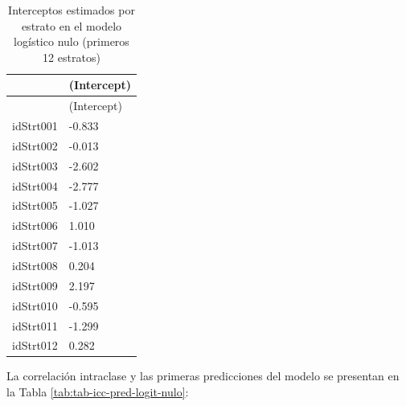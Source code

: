 \documentclass[
  spanish,
  12pt,
]{book}
\newenvironment{Shaded}{\begin{snugshade}}{\end{snugshade}}
\newcommand{\AttributeTok}[1]{\textcolor[rgb]{0.13,0.29,0.53}{#1}}
\newcommand{\DataTypeTok}[1]{\textcolor[rgb]{0.13,0.29,0.53}{#1}}
\newcommand{\DecValTok}[1]{\textcolor[rgb]{0.00,0.00,0.81}{#1}}
\newcommand{\FunctionTok}[1]{\textcolor[rgb]{0.13,0.29,0.53}{\textbf{#1}}}
\newcommand{\NormalTok}[1]{#1}
\newcommand{\OtherTok}[1]{\textcolor[rgb]{0.56,0.35,0.01}{#1}}
\newcommand{\SpecialCharTok}[1]{\textcolor[rgb]{0.81,0.36,0.00}{\textbf{#1}}}
\newcommand{\StringTok}[1]{\textcolor[rgb]{0.31,0.60,0.02}{#1}}
\begin{document}
\begin{longtable}[]{@{}ll@{}}
\caption{\label{tab:tab-coef-logit-nulo}Interceptos estimados por estrato en el modelo logístico nulo (primeros 12 estratos)}\tabularnewline
\toprule\noalign{}
& (Intercept) \\
\midrule\noalign{}
\endfirsthead
\toprule\noalign{}
& (Intercept) \\
\midrule\noalign{}
\endhead
\bottomrule\noalign{}
\endlastfoot
idStrt001 & -0.833 \\
idStrt002 & -0.013 \\
idStrt003 & -2.602 \\
idStrt004 & -2.777 \\
idStrt005 & -1.027 \\
idStrt006 & 1.010 \\
idStrt007 & -1.013 \\
idStrt008 & 0.204 \\
idStrt009 & 2.197 \\
idStrt010 & -0.595 \\
idStrt011 & -1.299 \\
idStrt012 & 0.282 \\
\end{longtable}

La correlación intraclase y las primeras predicciones del modelo se presentan en la Tabla \ref{tab:tab-icc-pred-logit-nulo}:

\begin{Shaded}
\end{Shaded}
\end{document}
